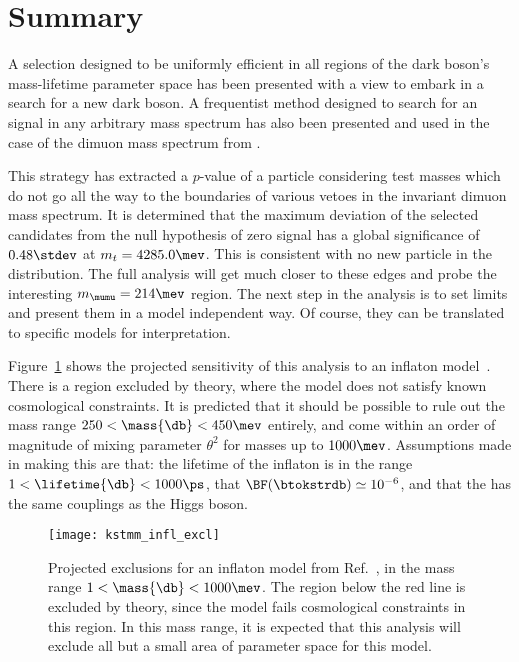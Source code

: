 \section{Summary}

A selection designed to be uniformly efficient in all regions of the dark boson's mass-lifetime
parameter space has been presented with a view to embark in a search for a new dark boson.
A frequentist method designed to search for an signal in any arbitrary mass spectrum has also been
presented and used in the case of the dimuon mass spectrum from \btokstrmumu.

This strategy has extracted a $p$-value of a particle considering test masses which do not go all
the way to the boundaries of various vetoes in the invariant dimuon mass spectrum.
It is determined that the maximum deviation of the selected candidates from the null hypothesis of
zero signal has a global significance of $0.48\stdev$ at $m_t = 4285.0\mev$.
This is consistent with no new particle in the \mumu distribution.
The full analysis will get much closer to these edges and probe the interesting $m_{\mumu}=214\mev$
region.
The next step in the analysis is to set limits and present them in a model independent way.
Of course, they can be translated to specific models for interpretation.


Figure~\ref{fig:db:excl:infl} shows the projected
sensitivity of this analysis to an inflaton model~\cite{Bezrukov:2014nza}.
There is a region excluded by theory, where the model does not satisfy known cosmological
constraints.
It is predicted that it should be possible to rule out the mass range
$250<\mass{\db}<450\mev$ entirely, and come within an order of magnitude of mixing parameter
$\theta^2$ for masses up to $1000\mev$.
Assumptions made in making this are that: the lifetime of the inflaton is in the range
$1<\lifetime{\db}<1000\ps$, that $\BF(\btokstrdb)\simeq10^{-6}$,
and that the \db has the same couplings as the Higgs boson.

\begin{figure}
  \begin{center}
    \texttt{[image: kstmm\_infl\_excl]}
    \caption[Projected sensitivity in an inflaton search]
    {
      Projected exclusions for an inflaton model from Ref.~\protect\cite{Bezrukov:2014nza}, in the
      mass range $1<\mass{\db}<1000\mev$.
      The region below the red line is excluded by theory, since the model fails cosmological
      constraints in this region.
      In this mass range, it is expected that this analysis will exclude all but a small area of
      parameter space for this model.
    }
    \label{fig:db:excl:infl}
  \end{center}
\end{figure}

